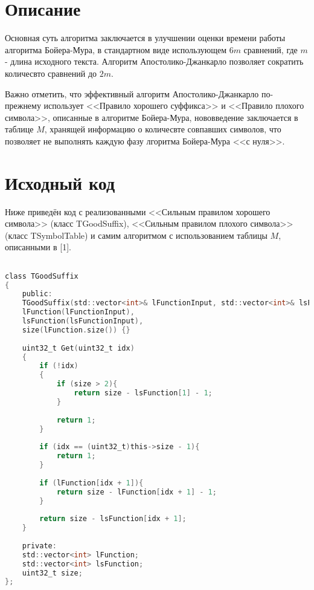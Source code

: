 \section{Описание}

Основная суть алгоритма заключается в улучшении оценки времени работы алгоритма Бойера-Мура, в стандартном виде использующем \(6m\) сравнений, где \(m\) - длина исходного текста. Алгоритм Апостолико-Джанкарло позволяет сократить количесвто сравнений до \(2m\).

\par

Важно отметить, что эффективный алгоритм Апостолико-Джанкарло по-прежнему использует <<Правило хорошего суффикса>> и <<Правило плохого символа>>, описанные в алгоритме Бойера-Мура, нововведение заключается в таблице \(M\), хранящей информацию о количесвте совпавших символов, что позволяет не выполнять каждую фазу лгоритма Бойера-Мура <<с нуля>>.

\pagebreak

\section{Исходный код}

Ниже приведён код с реализованными <<Сильным правилом хорошего символа>> (класс TGoodSuffix), <<Сильным правилом плохого символа>> (класс TSymbolTable) и самим алгоритмом с использованием таблицы \(M\), описанными в [1]. 

\begin{lstlisting}[language=C]

class TGoodSuffix
{
	public:
	TGoodSuffix(std::vector<int>& lFunctionInput, std::vector<int>& lsFunctionInput) : 
	lFunction(lFunctionInput), 
	lsFunction(lsFunctionInput),
	size(lFunction.size()) {}
	
	uint32_t Get(uint32_t idx)
	{
		if (!idx)
		{
			if (size > 2){
				return size - lsFunction[1] - 1;
			}
			
			return 1;
		}
		
		if (idx == (uint32_t)this->size - 1){
			return 1;
		}
		
		if (lFunction[idx + 1]){
			return size - lFunction[idx + 1] - 1;  
		}
		
		return size - lsFunction[idx + 1]; 
	}
	
	private:
	std::vector<int> lFunction;
	std::vector<int> lsFunction;
	uint32_t size;
};

\end{lstlisting}

